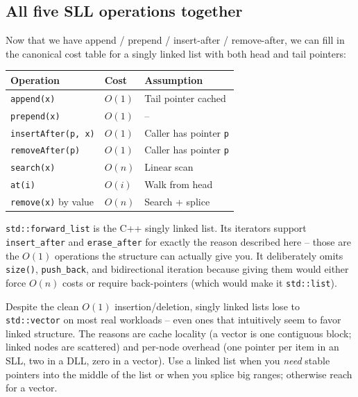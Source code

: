\documentclass[11pt]{article}
\begin{document}
\subsection{All five SLL operations together}

Now that we have append / prepend / insert-after / remove-after,
we can fill in the canonical cost table for a singly linked list
with both head and tail pointers:

\begin{center}
\footnotesize
\renewcommand{\arraystretch}{1.3}
\begin{tabular}{@{}lll@{}}
\hline
\textbf{Operation}   & \textbf{Cost}      & \textbf{Assumption} \\
\hline
\texttt{append(x)}        & $O(1)$         & Tail pointer cached \\
\texttt{prepend(x)}       & $O(1)$         & -- \\
\texttt{insertAfter(p, x)} & $O(1)$        & Caller has pointer \texttt{p} \\
\texttt{removeAfter(p)}   & $O(1)$         & Caller has pointer \texttt{p} \\
\texttt{search(x)}        & $O(n)$         & Linear scan \\
\texttt{at(i)}            & $O(i)$         & Walk from head \\
\texttt{remove(x)} by value & $O(n)$       & Search + splice \\
\hline
\end{tabular}
\end{center}

\begin{notebox}
\texttt{std::forward\_list} is the C++ singly linked list. Its
iterators support \texttt{insert\_after} and \texttt{erase\_after}
for exactly the reason described here -- those are the $O(1)$
operations the structure can actually give you. It deliberately
omits \texttt{size()}, \texttt{push\_back}, and bidirectional
iteration because giving them would either force $O(n)$ costs or
require back-pointers (which would make it \texttt{std::list}).
\end{notebox}

\begin{warnbox}
Despite the clean $O(1)$ insertion/deletion, singly linked lists
lose to \texttt{std::vector} on most real workloads -- even ones
that intuitively seem to favor linked structure. The reasons are
cache locality (a vector is one contiguous block; linked nodes are
scattered) and per-node overhead (one pointer per item in an SLL,
two in a DLL, zero in a vector). Use a linked list when you
\emph{need} stable pointers into the middle of the list or when you
splice big ranges; otherwise reach for a vector.
\end{warnbox}
\end{document}
